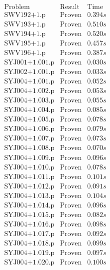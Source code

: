 \documentclass[a4paper,11pt]{report}
\theoremstyle{definition}
\theoremstyle{definition}
\theoremstyle{definition}
\theoremstyle{definition}
\theoremstyle{definition}
\theoremstyle{definition}
\theoremstyle{definition}
\begin{document}
	\begin{minipage}{0.45\textwidth}
		\[\begin{matrix}
			\text{Problem}&\text{Result}&\text{Time}\\
			\text{SWV192+1.p}&\text{Proven}& 0.394 s\\
			\text{SWV193+1.p}&\text{Proven}& 0.510 s\\
			\text{SWV194+1.p}&\text{Proven}& 0.520 s\\
			\text{SWV195+1.p}&\text{Proven}& 0.457 s\\
			\text{SWV196+1.p}&\text{Proven}& 0.387 s\\
			\text{SYJ001+1.001.p}&\text{Proven}& 0.030 s\\
			\text{SYJ002+1.001.p}&\text{Proven}& 0.033 s\\
			\text{SYJ004+1.001.p}&\text{Proven}& 0.052 s\\
			\text{SYJ004+1.002.p}&\text{Proven}& 0.053 s\\
			\text{SYJ004+1.003.p}&\text{Proven}& 0.055 s\\
			\text{SYJ004+1.004.p}&\text{Proven}& 0.085 s\\
			\text{SYJ004+1.005.p}&\text{Proven}& 0.078 s\\
			\text{SYJ004+1.006.p}&\text{Proven}& 0.079 s\\
			\text{SYJ004+1.007.p}&\text{Proven}& 0.073 s\\
			\text{SYJ004+1.008.p}&\text{Proven}& 0.070 s\\
			\text{SYJ004+1.009.p}&\text{Proven}& 0.096 s\\
			\text{SYJ004+1.010.p}&\text{Proven}& 0.078 s\\
			\text{SYJ004+1.011.p}&\text{Proven}& 0.101 s\\
			\text{SYJ004+1.012.p}&\text{Proven}& 0.091 s\\
			\text{SYJ004+1.013.p}&\text{Proven}& 0.104 s\\
			\text{SYJ004+1.014.p}&\text{Proven}& 0.096 s\\
			\text{SYJ004+1.015.p}&\text{Proven}& 0.082 s\\
			\text{SYJ004+1.016.p}&\text{Proven}& 0.098 s\\
			\text{SYJ004+1.017.p}&\text{Proven}& 0.092 s\\
			\text{SYJ004+1.018.p}&\text{Proven}& 0.099 s\\
			\text{SYJ004+1.019.p}&\text{Proven}& 0.097 s\\
			\text{SYJ004+1.020.p}&\text{Proven}& 0.100 s\\

\end{matrix}\]
\end{minipage}
\end{document}
